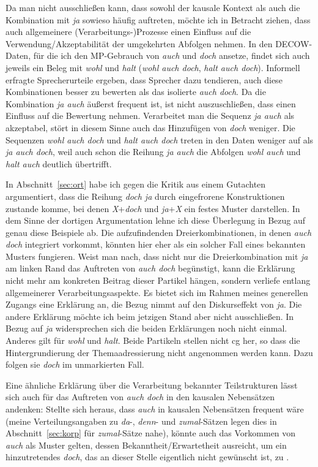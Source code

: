 Da man nicht ausschließen kann, dass sowohl der kausale Kontext als auch die Kombination mit \textit{ja} sowieso häufig auftreten, möchte ich in Betracht ziehen, dass auch allgemeinere (Verarbeitungs-)Prozesse einen Einfluss auf die Verwendung/Akzeptabilität der umgekehrten Abfolgen nehmen. In den DECOW-Daten, für die ich den MP-Gebrauch von \textit{auch} und \textit{doch} ansetze, findet sich auch jeweils ein Beleg mit \textit{wohl} und \textit{halt} (\textit{wohl auch doch}, \textit{halt auch doch}). Informell erfragte Sprecherurteile ergeben, dass Sprecher dazu tendieren, auch diese Kombinationen besser zu bewerten als das isolierte \textit{auch doch}. Da die Kombination \textit{ja auch} äußerst frequent ist, ist nicht auszuschließen, dass  einen Einfluss auf die Bewertung nehmen. Verarbeitet man die Sequenz \textit{ja auch} als akzeptabel, stört in diesem Sinne auch das Hinzufügen von \textit{doch} weniger. Die Sequenzen \textit{wohl auch doch} und \textit{halt auch doch} treten in den Daten weniger auf als \textit{ja auch doch}, weil auch schon die Reihung \textit{ja auch} die Abfolgen \textit{wohl auch} und \textit{halt auch} deutlich übertrifft.

In Abschnitt~\ref{sec:ort} habe ich gegen die Kritik aus einem Gutachten argumentiert, dass die Reihung \textit{doch ja} durch eingefrorene Konstruktionen zustande komme, bei denen \textit{X}+\textit{doch} und \textit{ja}+\textit{X} ein festes Muster darstellen. In dem Sinne der dortigen Argumentation lehne ich diese Überlegung in Bezug auf genau diese Beispiele ab. Die aufzufindenden Dreierkombinationen, in denen \textit{auch doch} integriert vorkommt, könnten hier eher als ein solcher Fall eines bekannten Musters fungieren. Weist man nach, dass nicht nur die Dreierkombination mit \textit{ja} am linken Rand das Auftreten von \textit{auch doch} begünstigt, kann die Erklärung nicht mehr am konkreten Beitrag dieser Partikel hängen, sondern verliefe entlang allgemeinerer Verarbeitungsaspekte. Es bietet sich im Rahmen meines generellen Zugangs eine Erklärung an, die Bezug nimmt auf den Diskurseffekt von \textit{ja}. Die andere Erklärung möchte ich beim jetzigen Stand aber nicht ausschließen. In Bezug auf \textit{ja} widersprechen sich die beiden Erklärungen noch nicht einmal. Anderes gilt für \textit{wohl} und \textit{halt}. Beide Partikeln stellen nicht cg her, so dass die Hintergrundierung der Themaadressierung nicht angenommen werden kann. Dazu folgen sie \textit{doch} im unmarkierten Fall. 

Eine ähnliche Erklärung über die Verarbeitung bekannter Teilstrukturen lässt sich auch für das Auftreten von \textit{auch doch} in den kausalen Nebensätzen andenken: Stellte sich heraus, dass \textit{auch} in kausalen Nebensätzen frequent wäre (meine Verteilungsangaben zu \textit{da}-, \textit{denn}- und \textit{zumal}-Sätzen legen dies in Abschnitt~\ref{sec:korp} für \textit{zumal}-Sätze nahe), könnte auch das Vorkommen von \textit{auch} als Muster gelten, dessen Bekanntheit/Erwartetheit ausreicht, um ein hinzutretendes \textit{doch}, das an dieser Stelle eigentlich nicht gewünscht ist, zu .\\

